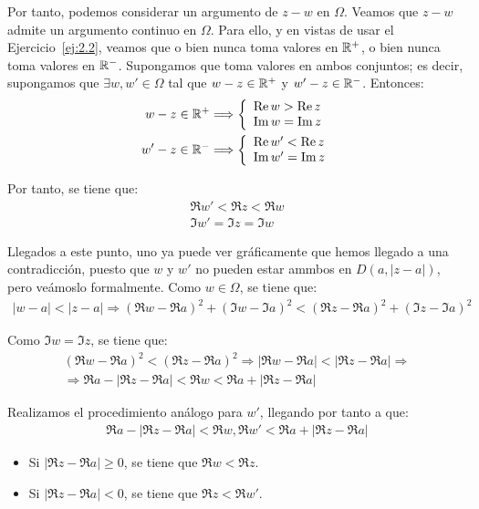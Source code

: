 \begin{ejercicio}
\begin{description}
        Por tanto, podemos considerar un argumento de $z-w$ en $\Omega$. Veamos que $z-w$ admite un argumento continuo en $\Omega$. Para ello, y en vistas de usar el Ejercicio~\ref{ej:2.2}, veamos que o bien nunca toma valores en $\mathbb{R}^+$, o bien nunca toma valores en $\mathbb{R}^-$. Supongamos que toma valores en ambos conjuntos; es decir, supongamos que $\exists w,w'\in \Omega$ tal que $w-z\in \mathbb{R}^+$ y $w'-z\in \mathbb{R}^-$. Entonces:
        \begin{align*}
            w-z\in \mathbb{R}^+ & \Longrightarrow \left\{\begin{array}{l}
                \operatorname{Re} w > \operatorname{Re} z\\
                \operatorname{Im} w = \operatorname{Im} z
            \end{array}\right.\\
            w'-z\in \mathbb{R}^- & \Longrightarrow \left\{\begin{array}{l}
                \operatorname{Re} w' < \operatorname{Re} z\\
                \operatorname{Im} w' = \operatorname{Im} z
            \end{array}\right.
        \end{align*}

        Por tanto, se tiene que:
        \begin{align*}
            \Re w' < \Re z < \Re w\\
            \Im w' = \Im z = \Im w
        \end{align*}

        Llegados a este punto, uno ya puede ver gráficamente que hemos llegado a una contradicción, puesto que $w$ y $w'$ no pueden estar ammbos en $D(a,|z-a|)$, pero veámoslo formalmente.
        Como $w\in \Omega$, se tiene que:
        \begin{align*}
            |w-a| < |z-a|\Longrightarrow \left(\Re w-\Re a\right)^2+\left(\Im w-\Im a\right)^2 < \left(\Re z-\Re a\right)^2+\left(\Im z-\Im a\right)^2
        \end{align*}

        Como $\Im w=\Im z$, se tiene que:
        \begin{multline*}
            \left(\Re w-\Re a\right)^2<\left(\Re z-\Re a\right)^2
            \Longrightarrow |\Re w-\Re a|<|\Re z-\Re a|\Longrightarrow \\ \Longrightarrow
            \Re a - |\Re z -\Re a| < \Re w < \Re a + |\Re z - \Re a|
        \end{multline*}

        Realizamos el procedimiento análogo para $w'$, llegando por tanto a que:
        \begin{align*}
            \Re a - |\Re z -\Re a| < \Re w,\Re w' < \Re a + |\Re z - \Re a|
        \end{align*}
        \begin{itemize}
            \item Si $|\Re z -\Re a| \geq 0$, se tiene que $\Re w<\Re z$.
            \item Si $|\Re z -\Re a| < 0$, se tiene que $\Re z<\Re w'$.
        \end{itemize}


\end{description}
\end{ejercicio}

